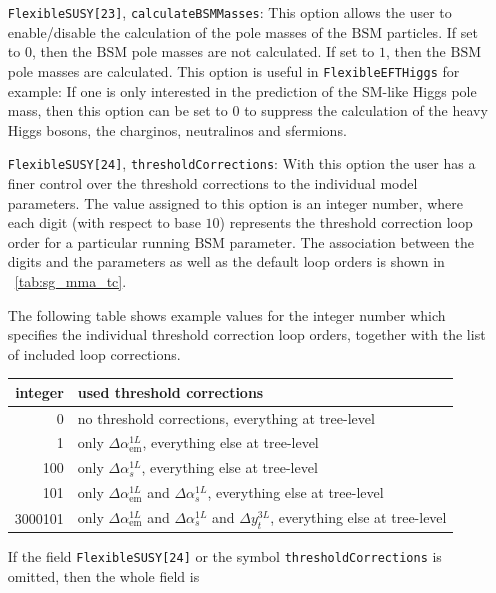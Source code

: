 \documentclass[final,3p,11pt,pdflatex]{elsarticle}
\makeatletter
\newcommand{\feft}{\texttt{Flex\-ib\-le\-EFT\-Higgs}\@\xspace}
\newcommand{\BSM}{\ensuremath{\text{BSM}}\xspace}
\newcommand{\tabref}[1]{\tablename~\ref{#1}}
\def\as{\alpha_s}
\def\aem{\alpha_{\text{em}}}
\makeatother
\begin{document}
\begin{itemize}
\item[\texttt{FlexibleSUSY[23]},] \texttt{calculateBSMMasses}: This
  option allows the user to enable/disable the calculation of the pole
  masses of the \BSM particles.  If set to $0$, then the \BSM pole
  masses are not calculated.  If set to $1$, then the \BSM pole masses
  are calculated.  This option is useful in \feft for example: If one
  is only interested in the prediction of the SM-like Higgs pole mass,
  then this option can be set to $0$ to suppress the calculation of
  the heavy Higgs bosons, the charginos, neutralinos and sfermions.

\item[\texttt{FlexibleSUSY[24]},] \texttt{thresholdCorrections}: With
  this option the user has a finer control over the threshold
  corrections to the individual model parameters.  The value assigned
  to this option is an integer number, where each digit (with respect to base
  $10$) represents the threshold correction loop order for a
  particular running \BSM parameter.  The association between the
  digits and the parameters as well as the default loop orders is
  shown in \tabref{tab:sg_mma_tc}.
  \begin{example}
    The following table shows example values for the integer number
    which specifies the individual threshold correction loop orders,
    together with the list of included loop corrections.
    \begin{center}
    \begin{tabular}{rl}
      \toprule
      integer & used threshold corrections \\
      \midrule
      0       & no threshold corrections, everything at tree-level \\
      1       & only $\Delta\aem^{1L}$, everything else at tree-level \\
      100     & only $\Delta\as^{1L}$, everything else at tree-level \\
      101     & only $\Delta\aem^{1L}$ and  $\Delta\as^{1L}$, everything else at tree-level \\
      3000101 & only $\Delta\aem^{1L}$ and  $\Delta\as^{1L}$ and  $\Delta y_t^{3L}$, everything else at tree-level \\
      \bottomrule
    \end{tabular}
  \end{center}
  \end{example}
  If the field \texttt{FlexibleSUSY[24]} or the symbol
  \texttt{thresholdCorrections} is omitted, then the whole field is

\end{itemize}
\end{document}
